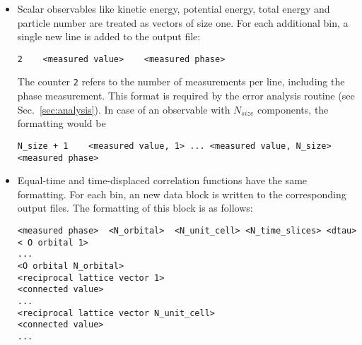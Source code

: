 \begin{itemize}
\item Scalar observables like kinetic energy, potential energy, total energy and particle number 
are treated as vectors of size one. For each additional bin, a single new line is added to the output file:
\begin{verbatim}
2    <measured value>    <measured phase>
\end{verbatim}
The counter \texttt{2} refers to the number of measurements per line, including the phase measurement. 
This format is required by the error analysis routine (see Sec.~\ref{sec:analysis}). 
In case of an observable with $N_{size}$ components, the formatting would be 
\begin{verbatim}
N_size + 1    <measured value, 1> ... <measured value, N_size>    <measured phase>
\end{verbatim}

\item Equal-time and time-displaced correlation functions have the same formatting. 
For each bin, an new data block is written to the corresponding output files.
The formatting of this block is as follows:
\begin{verbatim}
<measured phase>  <N_orbital>  <N_unit_cell> <N_time_slices> <dtau>
< O orbital 1>
...
<O orbital N_orbital>
<reciprocal lattice vector 1>
<connected value>
...
<reciprocal lattice vector N_unit_cell>
<connected value>
...
\end{verbatim}

\end{itemize}

